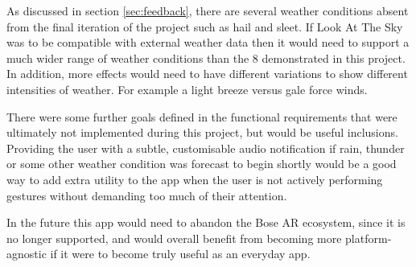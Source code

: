 \documentclass{l4proj}
\begin{document}
As discussed in section \ref{sec:feedback}, there are several weather conditions absent from the final iteration of the project such as hail and sleet. If Look At The Sky was to be compatible with external weather data then it would need to support a much wider range of weather conditions than the 8 demonstrated in this project. In addition, more effects would need to have different variations to show different intensities of weather. For example a light breeze versus gale force winds.

There were some further goals defined in the functional requirements that were ultimately not implemented during this project, but would be useful inclusions. Providing the user with a subtle, customisable audio notification if rain, thunder or some other weather condition was forecast to begin shortly would be a good way to add extra utility to the app when the user is not actively performing gestures without demanding too much of their attention.

In the future this app would need to abandon the Bose AR ecosystem, since it is no longer supported, and would overall benefit from becoming more platform-agnostic if it were to become truly useful as an everyday app.
%
% 
\end{document}
